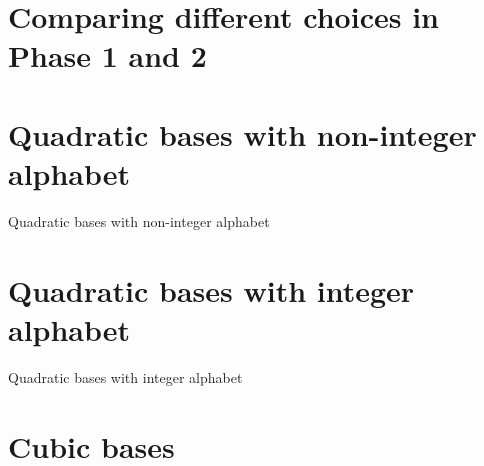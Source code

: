 

\section{Comparing different choices in Phase 1 and 2}

\section{Quadratic bases with non-integer alphabet}
\begin{table}[h]
	\begin{center}
	
	\end{center}
\caption{Quadratic bases with non-integer alphabet}
\label{tab:resultsQuadrNonint}
\end{table}


\section{Quadratic bases with integer alphabet}
\begin{table}[h]
	\begin{center}
	
	\end{center}
\caption{Quadratic bases with integer alphabet}
\label{tab:resultsQuadrInt}
\end{table}



\section{Cubic bases}





